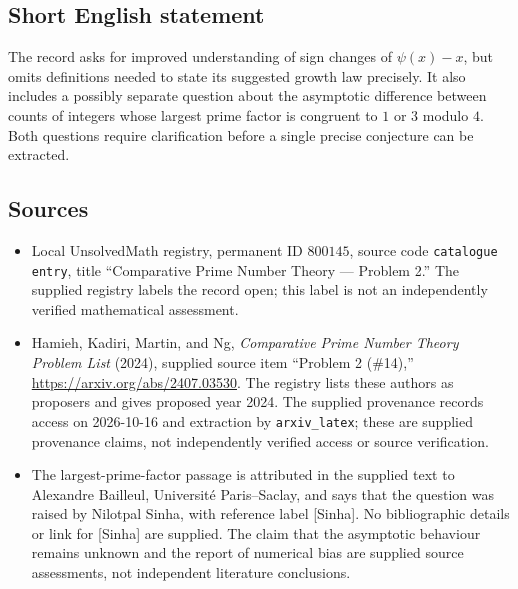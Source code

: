 \documentclass[11pt]{article}
\begin{document}
\subsection{Short English statement}
The record asks for improved understanding of sign changes of \(\psi(x)-x\), but omits definitions needed to state its suggested growth law precisely. It also includes a possibly separate question about the asymptotic difference between counts of integers whose largest prime factor is congruent to \(1\) or \(3\) modulo \(4\). Both questions require clarification before a single precise conjecture can be extracted.
\subsection{Sources}
\begin{itemize}
\item Local UnsolvedMath registry, permanent ID \(800145\), source code \texttt{catalogue entry}, title ``Comparative Prime Number Theory --- Problem 2.'' The supplied registry labels the record open; this label is not an independently verified mathematical assessment.
\item Hamieh, Kadiri, Martin, and Ng, \emph{Comparative Prime Number Theory Problem List} (2024), supplied source item ``Problem 2 (\#14),'' \url{https://arxiv.org/abs/2407.03530}. The registry lists these authors as proposers and gives proposed year 2024. The supplied provenance records access on 2026-10-16 and extraction by \texttt{arxiv\_latex}; these are supplied provenance claims, not independently verified access or source verification.
\item The largest-prime-factor passage is attributed in the supplied text to Alexandre Bailleul, Universit\'e Paris--Saclay, and says that the question was raised by Nilotpal Sinha, with reference label [Sinha]. No bibliographic details or link for [Sinha] are supplied. The claim that the asymptotic behaviour remains unknown and the report of numerical bias are supplied source assessments, not independent literature conclusions.
\end{itemize}
\end{document}
